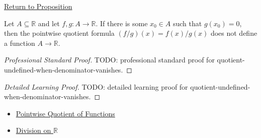 \newpage
{}
\label{prf:quotient-undefined-when-denominator-vanishes}

\begin{remark*}[Return]
\hyperref[prop:quotient-undefined-when-denominator-vanishes]{Return to Proposition}
\end{remark*}

\begin{proposition*}
Let \(A\subseteq\mathbb{R}\) and let \(f,g:A\to\mathbb{R}\).  If there is
some \(x_0\in A\) such that \(g(x_0)=0\), then the pointwise quotient
formula \((f/g)(x)=f(x)/g(x)\) does not define a function \(A\to\mathbb{R}\).
\end{proposition*}

\begin{proof}[Professional Standard Proof]
\LRAProofBodyStart
TODO: professional standard proof for quotient-undefined-when-denominator-vanishes.
\end{proof}

\begin{proof}[Detailed Learning Proof]
\LRAProofBodyStart
TODO: detailed learning proof for quotient-undefined-when-denominator-vanishes.
\end{proof}

\begin{remark*}
\end{remark*}

\begin{dependencies}
\begin{itemize}
  \item \hyperref[def:pointwise-quotient-of-functions]{Pointwise Quotient of Functions}
  \item \hyperref[def:division-on-r]{Division on \(\mathbb{R}\)}
\end{itemize}
\end{dependencies}

\clearpage
